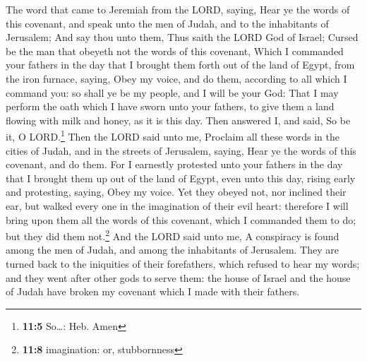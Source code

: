  The word that came to Jeremiah from the LORD, saying,
 Hear ye the words of this covenant, and speak unto the
men of Judah, and to the inhabitants of Jerusalem;  And
say thou unto them, Thus saith the LORD God of Israel; Cursed be the man
that obeyeth not the words of this covenant,  Which I
commanded your fathers in the day that I brought them forth out of the
land of Egypt, from the iron furnace, saying, Obey my voice, and do
them, according to all which I command you: so shall ye be my people,
and I will be your God:  That I may perform the oath which
I have sworn unto your fathers, to give them a land flowing with milk
and honey, as it is this day. Then answered I, and said, So be it, O
LORD.\footnote{\textbf{11:5} So\ldots: Heb. Amen}  Then
the LORD said unto me, Proclaim all these words in the cities of Judah,
and in the streets of Jerusalem, saying, Hear ye the words of this
covenant, and do them.  For I earnestly protested unto
your fathers in the day that I brought them up out of the land of Egypt,
even unto this day, rising early and protesting, saying, Obey my voice.
 Yet they obeyed not, nor inclined their ear, but walked
every one in the imagination of their evil heart: therefore I will bring
upon them all the words of this covenant, which I commanded them to do;
but they did them not.\footnote{\textbf{11:8} imagination: or,
  stubbornness}  And the LORD said unto me, A conspiracy
is found among the men of Judah, and among the inhabitants of Jerusalem.
 They are turned back to the iniquities of their
forefathers, which refused to hear my words; and they went after other
gods to serve them: the house of Israel and the house of Judah have
broken my covenant which I made with their fathers.

